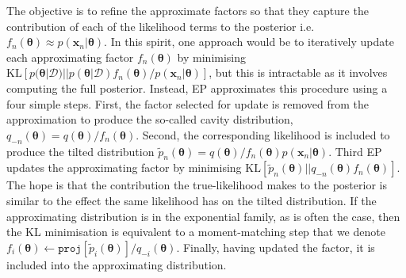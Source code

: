 The objective is to refine the approximate factors so that they capture the contribution of each of the likelihood terms to the posterior i.e.~$f_n(\bm{\theta}) \approx p(\bm{x}_n | \bm{\theta})$. In this spirit, one approach would be to iteratively update each approximating factor $f_n(\bm{\theta})$ by minimising $\mathrm{KL}[p(\bm{\theta}|\mathcal{D}) || p(\bm{\theta}|\mathcal{D}) f_n(\bm{\theta})/ p(\bm{x}_n | \bm{\theta})]$, but this is intractable as it involves computing the full posterior. Instead, EP approximates this procedure using a four simple steps. First, the factor selected for update is removed from the approximation to produce the so-called cavity distribution, $q_{-n}(\bm{\theta}) =q(\bm{\theta})/f_n(\bm{\theta})$. Second, the corresponding likelihood is included to produce the tilted distribution $\tilde{p}_n(\bm{\theta}) = q(\bm{\theta})/f_n(\bm{\theta}) p(\bm{x}_n | \bm{\theta})$. Third EP updates the approximating factor by minimising $\mathrm{KL}[\tilde{p}_n(\bm{\theta}) || q_{-n}(\bm{\theta})  f_n(\bm{\theta})]$. The hope is that the contribution the true-likelihood makes to the posterior is similar to the effect the same likelihood has on the tilted distribution. If the approximating distribution is in the exponential family, as is often the case, then the KL minimisation is equivalent to a moment-matching step \cite{amari:ig} that we denote $f_i(\bm{\theta}) \leftarrow \mathtt{proj}[\tilde{p}_i(\bm{\theta})] / q_{-i}(\bm{\theta}) $. Finally, having updated the factor, it is included into the approximating distribution.
%
%
%
%
%

